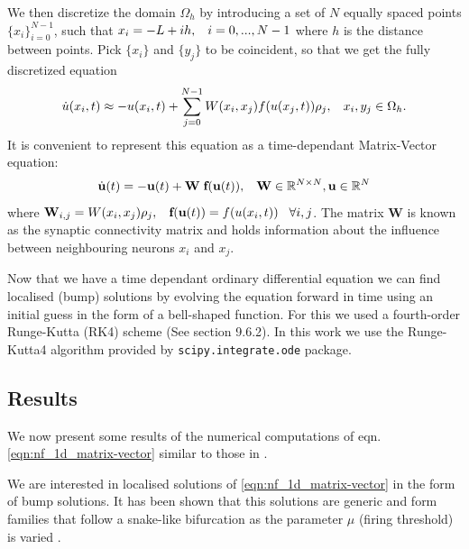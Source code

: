 \documentclass{uonmathreport}
\begin{document}
We then discretize the domain $\Omega_h$ by introducing a set of $N$ equally spaced points $\{x_i\}_{i=0}^{N-1}$, such that $x_i = -L + ih, \hspace{3mm} i = 0,...,N-1$ where $h$ is the distance between points. Pick $\{x_i\}$ and $\{y_j\}$ to be coincident, so that we get the fully discretized equation
\begin{equation}
\dot{u}(x_i, t) \approx -u(x_i, t) + \sum_{j=0}^{N-1} W(x_i, x_j)f(u(x_j, t))\rho_j, \hspace{3mm} x_i, y_j \in \Omega_h.
\end{equation}
It is convenient to represent this equation as a time-dependant Matrix-Vector equation:
\begin{equation}\label{eqn:nf_1d_matrix-vector}
\dot{\textbf{u}}(t) = -\textbf{u}(t) + \textbf{W} \hspace{1mm} \textbf{f}(\textbf{u}(t)), \hspace{3mm} \textbf{W} \in \mathbb{R}^{N\times N}, \textbf{u} \in \mathbb{R}^N
\end{equation}
where $\textbf{W}_{i,j} = W(x_i, x_j)\rho_j, \hspace{3mm}  \textbf{f}(\textbf{u}(t)) = f(u(x_i, t)) \hspace{3mm} \forall i,j$. The matrix $\textbf{W}$ is known as the synaptic connectivity matrix and holds information about the influence between neighbouring neurons $x_i$ and $x_j$.

Now that we have a time dependant ordinary differential equation we can find localised (bump) solutions by evolving the equation forward in time using an initial guess in the form of a bell-shaped function. For this we used a fourth-order Runge-Kutta (RK4) scheme (See \cite{heath2002scientific} section 9.6.2). In this work we use the Runge-Kutta4 algorithm provided by \texttt{scipy.integrate.ode} package.  

\subsection{Results}\label{subsec:1Dnystrom_results}

We now present some results of the numerical computations of eqn.\ref{eqn:nf_1d_matrix-vector} similar to those in \cite{rankin2014continuation}.

We are interested in localised solutions of \ref{eqn:nf_1d_matrix-vector} in the form of bump solutions. It has been shown that this solutions are generic and form families that follow a snake-like bifurcation as the parameter $\mu$ (firing threshold) is varied \cite{rankin2014continuation}.
\end{document}
